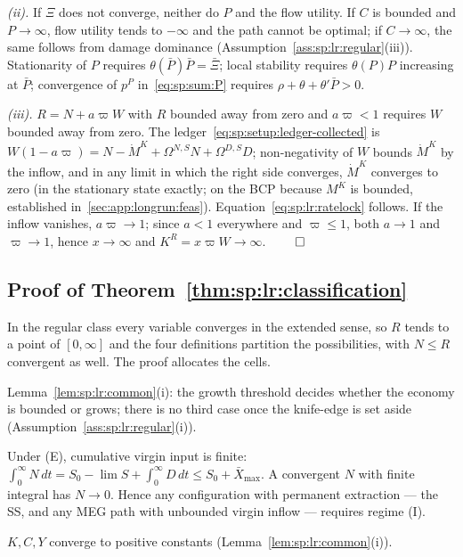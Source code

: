 \emph{(ii).} If $\Xi$ does not converge, neither do $P$ and the flow utility. If $C$ is bounded
and $P\to\infty$, flow utility tends to $-\infty$ and the path cannot be optimal; if
$C\to\infty$, the same follows from damage dominance
(Assumption~\ref{ass:sp:lr:regular}(iii)). Stationarity of $P$ requires
$\theta\left(\bar P\right)\bar P=\bar\Xi$; local stability requires $\theta(P)P$ increasing at
$\bar P$; convergence of $p^P$ in~\eqref{eq:sp:sum:P} requires $\rho+\theta+\theta'\bar P>0$.

\emph{(iii).} $R=N+a\varpi W$ with $R$ bounded away from zero and $a\varpi<1$ requires $W$
bounded away from zero. The ledger~\eqref{eq:sp:setup:ledger-collected} is
$W\left(1-a\varpi\right)=N-\dot M^K+\Omega^{N,S}N+\Omega^{D,S}D$; non-negativity of $W$ bounds
$\dot M^K$ by the inflow, and in any limit in which the right side converges, $\dot M^K$
converges to zero (in the stationary state exactly; on the BCP because $M^K$ is bounded,
established in~\ref{sec:app:longrun:feas}). Equation~\eqref{eq:sp:lr:ratelock} follows. If the
inflow vanishes, $a\varpi\to1$; since $a<1$ everywhere and $\varpi\le1$, both $a\to1$ and
$\varpi\to1$, hence $x\to\infty$ and $K^R=x\varpi W\to\infty$. \hfill$\qed$

\subsection{Proof of Theorem~\ref{thm:sp:lr:classification}}
\label{sec:app:longrun:classification}

In the regular class every variable converges in the extended sense, so $R$ tends to a point of
$\left[0,\infty\right]$ and the four definitions partition the possibilities, with
$N\le R$ convergent as well. The proof allocates the cells.

 Lemma~\ref{lem:sp:lr:common}(i): the growth threshold decides
whether the economy is bounded or grows; there is no third case once the knife-edge is set
aside (Assumption~\ref{ass:sp:lr:regular}(i)).

 Under (E), cumulative virgin input is finite:
$\int_0^\infty N\,dt=S_0-\lim S+\int_0^\infty D\,dt\le S_0+\bar X_{\max}$. A convergent $N$
with finite integral has $N\to0$. Hence any configuration with permanent extraction --- the SS,
and any MEG path with unbounded virgin inflow --- requires regime (I).

 $K,C,Y$ converge to positive
constants (Lemma~\ref{lem:sp:lr:common}(i)).

